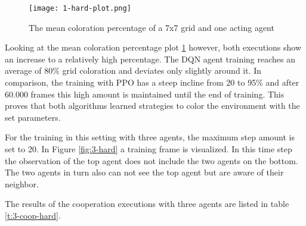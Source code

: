 \begin{figure}[hpbt]
    \centering
    \texttt{[image: 1-hard-plot.png]}\\
    \caption[Mean Coloration Percentage of one Agent in a 7x7 Environment]{The mean coloration percentage of a 7x7 grid and one acting agent}\label{fig:1-hard-plot}
\end{figure}

Looking at the mean coloration percentage plot \ref{fig:1-hard-plot} however, both executions show an increase to a relatively high percentage. The DQN agent training reaches an average of 80\% grid coloration and deviates only slightly around it. In comparison, the training with PPO has a steep incline from 20 to 95\% and after 60.000 frames this high amount is maintained until the end of training. This proves that both algorithms learned strategies to color the environment with the set parameters.

For the training in this setting with three agents, the maximum step amount is set to 20. In Figure \ref{fig:3-hard} a training frame is visualized. In this time step the observation of the top agent does not include the two agents on the bottom. The two agents in turn also can not see the top agent but are aware of their neighbor. 

The results of the cooperation executions with three agents are listed in table \ref{t:3-coop-hard}. \\


